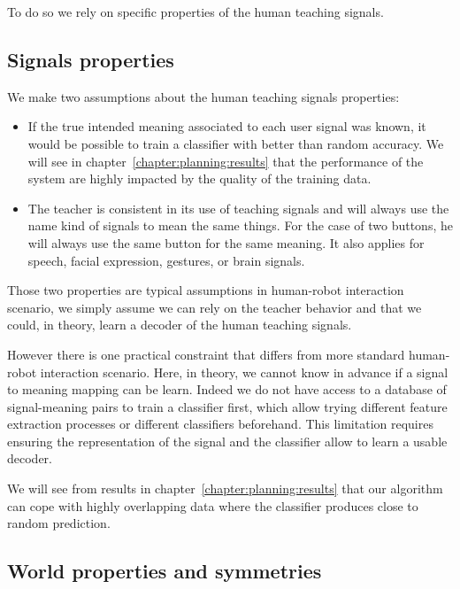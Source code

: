 To do so we rely on specific properties of the human teaching signals.

\subsection{Signals properties}
\label{chapter:lfui:signalproperties}

We make two assumptions about the human teaching signals properties:

\begin{itemize}

\item If the true intended meaning associated to each user signal was known, it would be possible to train a classifier with better than random accuracy. We will see in chapter~\ref{chapter:planning:results} that the performance of the system are highly impacted by the quality of the training data.

\item The teacher is consistent in its use of teaching signals and will always use the name kind of signals to mean the same things. For the case of two buttons, he will always use the same button for the same meaning. It also applies for speech, facial expression, gestures, or brain signals. 

\end{itemize}

Those two properties are typical assumptions in human-robot interaction scenario, we simply assume we can rely on the teacher behavior and that we could, in theory, learn a decoder of the human teaching signals.

However there is one practical constraint that differs from more standard human-robot interaction scenario. Here, in theory, we cannot know in advance if a signal to meaning mapping can be learn. Indeed we do not have access to a database of signal-meaning pairs to train a classifier first, which allow trying different feature extraction processes or different classifiers beforehand. This limitation requires ensuring the representation of the signal and the classifier allow to learn a usable decoder.

We will see from results in chapter~\ref{chapter:planning:results} that our algorithm can cope with highly overlapping data where the classifier produces close to random prediction.

\subsection{World properties and symmetries}
\label{chapter:lfui:symmetries}

